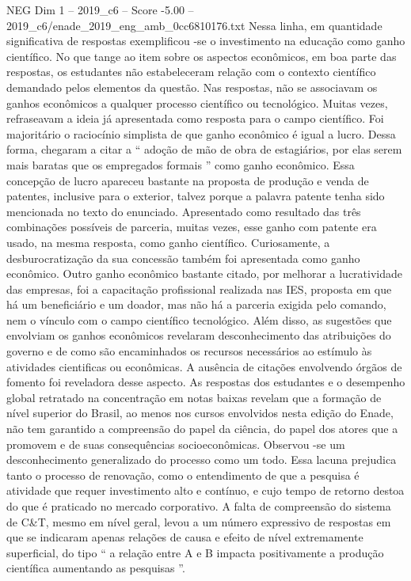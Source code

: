 \begin{textsample}{NEG Dim 1 – 2019\_c6 – Score -5.00 – 2019\_c6/enade\_2019\_eng\_amb\_0cc6810176.txt}
Nessa linha, em quantidade significativa de respostas exemplificou -se o investimento na educação como ganho científico.
No que tange ao item sobre os aspectos econômicos, em boa parte das respostas, os estudantes não estabeleceram relação com o contexto científico demandado pelos elementos da questão.
Nas respostas, não se associavam os ganhos econômicos a qualquer processo científico ou tecnológico.
Muitas vezes, refraseavam a ideia já apresentada como resposta para o campo científico.
Foi majoritário o raciocínio simplista de que ganho econômico é igual a lucro.
Dessa forma, chegaram a citar a “ adoção de mão de obra de estagiários, por elas serem mais baratas que os empregados formais ” como ganho econômico.
Essa concepção de lucro apareceu bastante na proposta de produção e venda de patentes, inclusive para o exterior, talvez porque a palavra patente tenha sido mencionada no texto do enunciado.
Apresentado como resultado das três combinações possíveis de parceria, muitas vezes, esse ganho com patente era usado, na mesma resposta, como ganho científico.
Curiosamente, a desburocratização da sua concessão também foi apresentada como ganho econômico.
Outro ganho econômico bastante citado, por melhorar a lucratividade das empresas, foi a capacitação profissional realizada nas IES, proposta em que há um beneficiário e um doador, mas não há a parceria exigida pelo comando, nem o vínculo com o campo científico tecnológico.
Além disso, as sugestões que envolviam os ganhos econômicos revelaram desconhecimento das atribuições do governo e de como são encaminhados os recursos necessários ao estímulo às atividades cientificas ou econômicas.
A ausência de citações envolvendo órgãos de fomento foi reveladora desse aspecto.
As respostas dos estudantes e o desempenho global retratado na concentração em notas baixas revelam que a formação de nível superior do Brasil, ao menos nos cursos envolvidos nesta edição do Enade, não tem garantido a compreensão do papel da ciência, do papel dos atores que a promovem e de suas consequências socioeconômicas.
Observou -se um desconhecimento generalizado do processo como um todo.
Essa lacuna prejudica tanto o processo de renovação, como o entendimento de que a pesquisa é atividade que requer investimento alto e contínuo, e cujo tempo de retorno destoa do que é praticado no mercado corporativo.
A falta de compreensão do sistema de C\&T, mesmo em nível geral, levou a um número expressivo de respostas em que se indicaram apenas relações de causa e efeito de nível extremamente superficial, do tipo “ a relação entre A e B impacta positivamente a produção científica aumentando as pesquisas ”.

\end{textsample}
